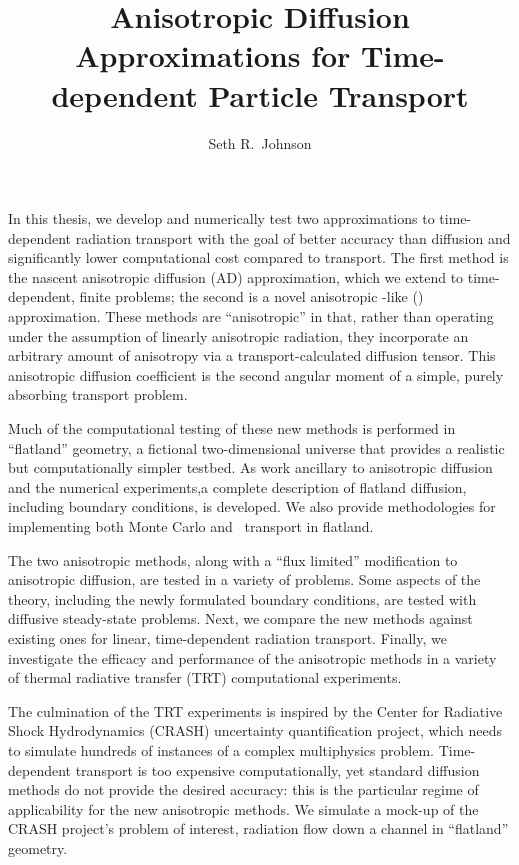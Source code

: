 \documentclass{umthesis}
\author{Seth R.~Johnson}
\title{Anisotropic Diffusion Approximations for Time-dependent Particle
Transport}
\begin{document}
\begin{finalabstract}

In this thesis, we develop and numerically test two approximations to
time-dependent radiation transport with the goal of better accuracy than
diffusion and significantly lower computational cost compared to
transport. The first method is the nascent anisotropic diffusion (AD)
approximation, which we extend to time-dependent, finite problems; the
second is a novel anisotropic \Pone-like (\APone) approximation. These methods
are ``anisotropic'' in that, rather than operating under the assumption of
linearly anisotropic radiation, they incorporate an arbitrary amount of
anisotropy via a transport-calculated diffusion tensor. This anisotropic
diffusion coefficient is the second angular moment of a simple, purely
absorbing transport problem.

Much of the computational testing of these new methods is performed in
``flatland'' geometry, a fictional two-dimensional universe that provides a
realistic but computationally simpler testbed. As work ancillary to anisotropic
diffusion and the numerical experiments,a complete description
of flatland diffusion, including boundary conditions, is developed. We also
provide methodologies for implementing both Monte Carlo and \SN\ transport in
flatland.

The two anisotropic methods, along with a ``flux limited'' modification to
anisotropic diffusion, are tested in a variety of problems. Some aspects of the
theory, including the newly formulated boundary conditions, are tested with
diffusive steady-state problems. Next, we compare the new methods against
existing ones for linear, time-dependent radiation transport. Finally, we
investigate the efficacy and performance of the anisotropic methods in a variety
of thermal radiative transfer (TRT) computational experiments.

The culmination of the TRT experiments is inspired by the Center for
Radiative Shock Hydrodynamics (CRASH) uncertainty quantification project, which
needs to simulate hundreds of instances of a complex multiphysics problem.
Time-dependent transport is too expensive computationally, yet standard
diffusion methods do not provide the desired accuracy: this is the particular
regime of applicability for the new anisotropic methods. We simulate a mock-up
of the CRASH project's problem of interest, radiation flow down a channel in
``flatland'' geometry.
\end{finalabstract}

\end{document}
